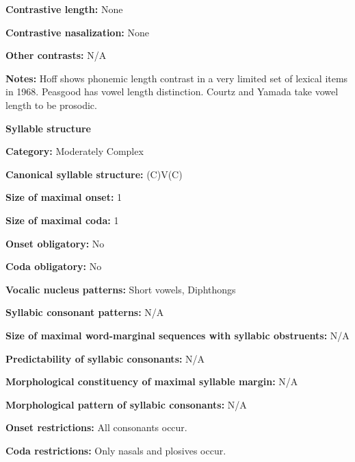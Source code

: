 \textbf{Contrastive length:} None



\textbf{Contrastive nasalization:} None



\textbf{Other contrasts:} N/A



\textbf{Notes:} Hoff shows phonemic length contrast in a very limited set of lexical items in 1968. Peasgood has vowel length distinction. Courtz and Yamada take vowel length to be prosodic.



\textbf{Syllable structure}



\textbf{Category:} Moderately Complex



\textbf{Canonical syllable structure:} (C)V(C) \citep[22-7]{Courtz2008}



\textbf{Size of maximal onset:} 1



\textbf{Size of maximal coda:} 1



\textbf{Onset obligatory:} No



\textbf{Coda obligatory:} No



\textbf{Vocalic nucleus patterns:} Short vowels, Diphthongs



\textbf{Syllabic consonant patterns:} N/A



\textbf{Size of maximal word{}-marginal sequences with syllabic obstruents:} N/A



\textbf{Predictability of syllabic consonants:} N/A



\textbf{Morphological constituency of maximal syllable margin:} N/A



\textbf{Morphological pattern of syllabic consonants:} N/A



\textbf{Onset restrictions:} All consonants occur.



\textbf{Coda restrictions:} Only nasals and plosives occur.



